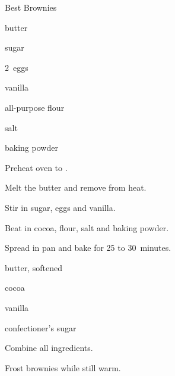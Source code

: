 \begin{recipe}{Best Brownies}{}{}

\begin{ingredients}
\item \C{\half} butter
\item {} sugar
\item 2~eggs
\item {} vanilla
\item \C{\third} 
\item \C{\half} all-purpose flour
\item \tp{\quarter} salt
\item \tp{\quarter} baking powder
\end{ingredients}

\begin{directions}
\item Preheat oven to .
\item Melt the butter and remove from heat.
\item Stir in sugar, eggs and vanilla.
\item Beat in cocoa, flour, salt and baking powder.
\item Spread in pan and bake for 25 to 30~minutes.
\end{directions}


\begin{ingredients}
\item {} butter, softened
\item {} cocoa
\item {} 
\item {} vanilla
\item {} confectioner's sugar
\end{ingredients}

\begin{directions}
\item Combine all ingredients.
\item Frost brownies while still warm.
\end{directions}
\end{recipe}
